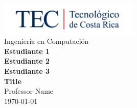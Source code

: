 
\thispagestyle{empty} %
\begin{center}
    \vspace*{1cm}
    \includegraphics[width=0.5\textwidth]{assets/logo_tec.jpg}\\
    \vspace{5mm}
    {\large{Ingeniería en Computación}\\}
    \vspace{10mm}
    \large{\textbf{Estudiante 1}}\\
    \large{\textbf{Estudiante 2}}\\
    \large{\textbf{Estudiante 3}}\\
    \vspace{5mm}
    \LARGE{\textbf{Title}}\\
    \vspace{10mm}
    \normalsize{Professor Name}\\
    \vspace{5mm}
    \normalsize{\today}
\end{center}

